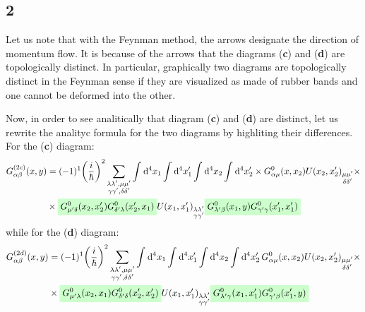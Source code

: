 \documentclass[11pt, a4paper, twoside, openright]{article}
\begin{document}
\subsection*{2}
Let us note that with the Feynman method, the arrows designate the direction of momentum flow. It is because of the arrows that the diagrams (\textbf{c}) and (\textbf{d}) are topologically distinct.
In particular, graphically two diagrams are topologically distinct in the Feynman sense if they are visualized as made of rubber bands and one cannot be deformed into the other.


Now, in order to see analitically that diagram (\textbf{c}) and (\textbf{d}) are distinct, let us rewrite the analityc formula for the two diagrams by highliting their differences. For the (\textbf{c}) diagram:
\begin{equation*}
\begin{split}
  G_{\alpha \beta }^{(2c)} (x,y) &= (-1)^1 \qty(\frac{i}{\hbar })^2
   \sum_{\substack{\lambda \lambda', \mu \mu' \\ \gamma \gamma', \delta \delta'   } }^{} \int_{}^{} \dd[4]{x_1} \int_{}^{} \dd[4]{x_1'} \int_{}^{} \dd[4]{x_2} \int_{}^{} \dd[4]{x_2'}
   \times G_{\alpha \mu }^0 (x,x_2) U(x_2,x_2')_{\substack{ \mu \mu' \\ \delta \delta'} } \times \\
  & \times \mathcolorbox{green!20}{G^0_{\mu' \delta } (x_2,x_2')
  G^0_{\delta' \lambda } (x_2',x_1) }
  U(x_1,x_1')_{\substack{ \lambda \lambda' \\ \gamma \gamma'} }
  \mathcolorbox{green!20}{
  G^0_{\lambda' \beta } (x_1,y) G^0_{\gamma' \gamma } (x_1',x_1')
  }
\end{split}
\end{equation*}
while for the (\textbf{d}) diagram:
\begin{equation*}
\begin{split}
  G_{\alpha \beta }^{(2d)} (x,y) &= (-1)^1 \qty(\frac{i}{\hbar })^2
   \sum_{\substack{\lambda \lambda', \mu \mu' \\ \gamma \gamma', \delta \delta'   } }^{} \int_{}^{} \dd[4]{x_1} \int_{}^{} \dd[4]{x_1'} \int_{}^{} \dd[4]{x_2} \int_{}^{} \dd[4]{x_2'}
   G_{\alpha \mu }^0 (x,x_2) U(x_2,x_2')_{\substack{ \mu \mu' \\ \delta \delta'} } \times \\
  & \times \mathcolorbox{green!20}{G^0_{\mu' \lambda } (x_2,x_1) G^0_{\delta' \delta } (x_2',x_2') }
  U(x_1,x_1')_{\substack{ \lambda \lambda' \\ \gamma \gamma'} }
  \mathcolorbox{green!20}{
  G^0_{\lambda' \gamma } (x_1,x_1') G^0_{\gamma' \beta } (x_1',y)
  }
\end{split}
\end{equation*}
\end{document}
